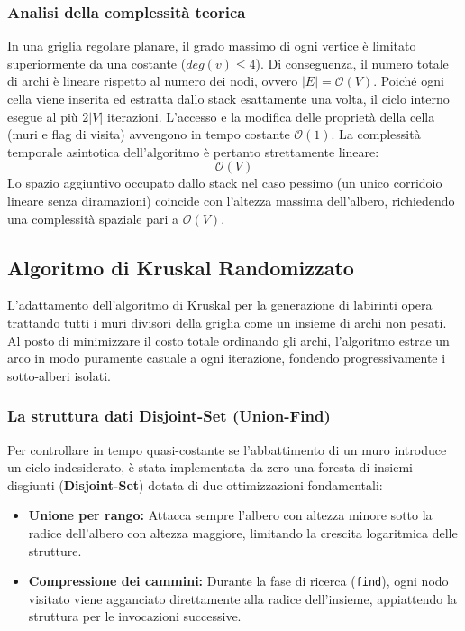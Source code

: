 \documentclass[12pt, a4paper]{article}
\begin{document}
	\subsubsection{Analisi della complessità teorica}
	In una griglia regolare planare, il grado massimo di ogni vertice è limitato superiormente da una costante ($deg(v) \le 4$). Di conseguenza, il numero totale di archi è lineare rispetto al numero dei nodi, ovvero $|E| = \mathcal{O}(V)$. 
	Poiché ogni cella viene inserita ed estratta dallo stack esattamente una volta, il ciclo interno esegue al più $2|V|$ iterazioni. L'accesso e la modifica delle proprietà della cella (muri e flag di visita) avvengono in tempo costante $\mathcal{O}(1)$. La complessità temporale asintotica dell'algoritmo è pertanto strettamente lineare:
	$$\mathcal{O}(V)$$
	Lo spazio aggiuntivo occupato dallo stack nel caso pessimo (un unico corridoio lineare senza diramazioni) coincide con l'altezza massima dell'albero, richiedendo una complessità spaziale pari a $\mathcal{O}(V)$.
	
	\subsection{Algoritmo di Kruskal Randomizzato}
	L'adattamento dell'algoritmo di Kruskal per la generazione di labirinti opera trattando tutti i muri divisori della griglia come un insieme di archi non pesati. Al posto di minimizzare il costo totale ordinando gli archi, l'algoritmo estrae un arco in modo puramente casuale a ogni iterazione, fondendo progressivamente i sotto-alberi isolati.
	
	\subsubsection{La struttura dati Disjoint-Set (Union-Find)}
	Per controllare in tempo quasi-costante se l'abbattimento di un muro introduce un ciclo indesiderato, è stata implementata da zero una foresta di insiemi disgiunti (\textbf{Disjoint-Set}) dotata di due ottimizzazioni fondamentali:
	\begin{itemize}
		\item \textbf{Unione per rango:} Attacca sempre l'albero con altezza minore sotto la radice dell'albero con altezza maggiore, limitando la crescita logaritmica delle strutture.
		\item \textbf{Compressione dei cammini:} Durante la fase di ricerca (\texttt{find}), ogni nodo visitato viene agganciato direttamente alla radice dell'insieme, appiattendo la struttura per le invocazioni successive.
	\end{itemize}
	
\end{document}
